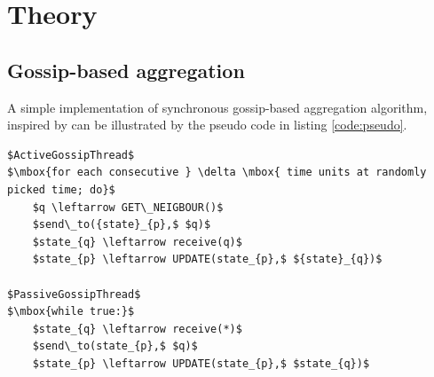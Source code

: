 \section{Theory}
\label{sec:theory}
\subsection{Gossip-based aggregation}
A simple implementation of synchronous gossip-based aggregation algorithm, inspired by \cite{jelasity_gossip-based_2005} can be illustrated by the pseudo code in listing \ref{code:pseudo}.

\begin{lstlisting}[caption={Pseudo Code for gossip-based aggregation}, label=code:pseudo, mathescape=true]
$ActiveGossipThread$
$\mbox{for each consecutive } \delta \mbox{ time units at randomly picked time; do}$
    $q \leftarrow GET\_NEIGBOUR()$
    $send\_to({state}_{p},$ $q)$
    $state_{q} \leftarrow receive(q)$
    $state_{p} \leftarrow UPDATE(state_{p},$ ${state}_{q})$

$PassiveGossipThread$
$\mbox{while true:}$
    $state_{q} \leftarrow receive(*)$
    $send\_to(state_{p},$ $q)$
    $state_{p} \leftarrow UPDATE(state_{p},$ $state_{q})$
\end{lstlisting}


